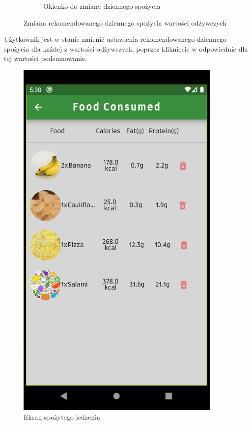 \documentclass[12pt, a4paper]{article}
\begin{document}
\begin{sloppypar}
{{\begin{figure}[H]
\begin{subfigure}{.5\textwidth}
        \caption{Okienko do zmiany dziennego spożycia}
        \label{fig:intake_alert}
      \end{subfigure}
      \caption{Zmiana rekomendowanego dziennego spożycia wartości odżywczych}
      \label{fig:change_intake}
    \end{figure} 

    Użytkownik jest w stanie zmienić ustawienia rekomendowanego dziennego spożycia dla każdej z
    wartości odżywczych, poprzez kliknięcie w odpowiednie dla tej wartości podsumowanie.

    \begin{figure}[H]
      \centering
      \includegraphics[scale=0.9]{screen_consumed.PNG}
      \caption{Ekran spożytego jedzenia}
      \label{fig:screen_consumed}
    \end{figure}

}}
\end{sloppypar}
\end{document}
